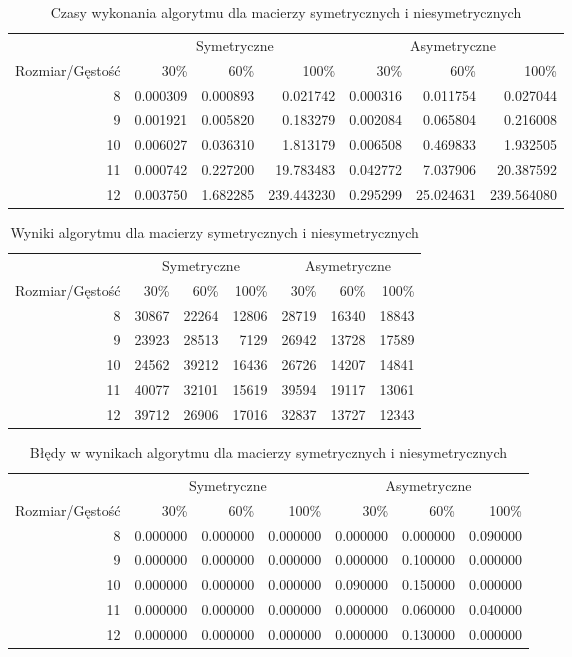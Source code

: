 \begin{table}[ht]
\centering
\begin{tabular}{rrrrrrr}
\toprule
 & \multicolumn{3}{c}{Symetryczne} & \multicolumn{3}{c}{Asymetryczne} \\
Rozmiar/Gęstość & 30\% & 60\% & 100\% & 30\% & 60\% & 100\% \\
\midrule
8 & 0.000309 & 0.000893 & 0.021742 & 0.000316 & 0.011754 & 0.027044 \\
9 & 0.001921 & 0.005820 & 0.183279 & 0.002084 & 0.065804 & 0.216008 \\
10 & 0.006027 & 0.036310 & 1.813179 & 0.006508 & 0.469833 & 1.932505 \\
11 & 0.000742 & 0.227200 & 19.783483 & 0.042772 & 7.037906 & 20.387592 \\
12 & 0.003750 & 1.682285 & 239.443230 & 0.295299 & 25.024631 & 239.564080 \\
\bottomrule
\end{tabular}
\caption{Czasy wykonania algorytmu dla macierzy symetrycznych i niesymetrycznych}
\label{tab:mean_time_bfsresoult}
\end{table}
\begin{table}[ht]
\centering
\begin{tabular}{rrrrrrr}
\toprule
 & \multicolumn{3}{c}{Symetryczne} & \multicolumn{3}{c}{Asymetryczne} \\
Rozmiar/Gęstość & 30\% & 60\% & 100\% & 30\% & 60\% & 100\% \\
\midrule
8 & 30867 & 22264 & 12806 & 28719 & 16340 & 18843 \\
9 & 23923 & 28513 & 7129 & 26942 & 13728 & 17589 \\
10 & 24562 & 39212 & 16436 & 26726 & 14207 & 14841 \\
11 & 40077 & 32101 & 15619 & 39594 & 19117 & 13061 \\
12 & 39712 & 26906 & 17016 & 32837 & 13727 & 12343 \\
\bottomrule
\end{tabular}
\caption{Wyniki algorytmu dla macierzy symetrycznych i niesymetrycznych}
\label{tab:resoult_bfsresoult}
\end{table}
\begin{table}[ht]
\centering
\begin{tabular}{rrrrrrr}
\toprule
 & \multicolumn{3}{c}{Symetryczne} & \multicolumn{3}{c}{Asymetryczne} \\
Rozmiar/Gęstość & 30\% & 60\% & 100\% & 30\% & 60\% & 100\% \\
\midrule
8 & 0.000000 & 0.000000 & 0.000000 & 0.000000 & 0.000000 & 0.090000 \\
9 & 0.000000 & 0.000000 & 0.000000 & 0.000000 & 0.100000 & 0.000000 \\
10 & 0.000000 & 0.000000 & 0.000000 & 0.090000 & 0.150000 & 0.000000 \\
11 & 0.000000 & 0.000000 & 0.000000 & 0.000000 & 0.060000 & 0.040000 \\
12 & 0.000000 & 0.000000 & 0.000000 & 0.000000 & 0.130000 & 0.000000 \\
\bottomrule
\end{tabular}
\caption{Błędy w wynikach algorytmu dla macierzy symetrycznych i niesymetrycznych}
\label{tab:error_bfsresoult}
\end{table}
